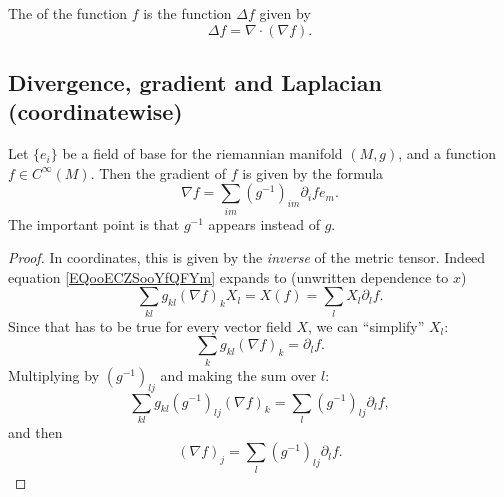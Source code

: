 The  of the function $f$ is the function $\Delta f$ given by
\begin{equation}
\Delta f=\nabla\cdot(\nabla f).
\end{equation}

\subsection{Divergence, gradient and Laplacian (coordinatewise)}

\begin{proposition}
    Let \( \{ e_i \}\) be a field of base for the riemannian manifold \( (M,g)\), and a function \( f\in C^{\infty}(M)\). Then the gradient of \( f\) is given by the formula
    \begin{equation}
        \nabla f=\sum_{im}(g^{-1})_{im}\partial_ife_m.
    \end{equation}
    The important point is that \( g^{-1}\) appears instead of \( g\).
\end{proposition}

\begin{proof}
    In coordinates, this is given by the \emph{inverse} of the metric tensor. Indeed equation \eqref{EQooECZSooYfQFYm} expands to (unwritten dependence to \( x\))
    \begin{equation}
        \sum_{kl}g_{kl}(\nabla f)_kX_l=X(f)=\sum_lX_l\partial_lf.
    \end{equation}
    Since that has to be true for every vector field \( X\), we can ``simplify'' \( X_l\):
    \begin{equation}
        \sum_kg_{kl}(\nabla f)_k=\partial_lf.
    \end{equation}
    Multiplying by \( (g^{-1})_{lj}\) and making the sum over \( l\):
    \begin{equation}
        \sum_{kl}g_{kl}(g^{-1})_{lj}(\nabla f)_k=\sum_l(g^{-1})_{lj}\partial_lf,
    \end{equation}
    and then
    \begin{equation}
        (\nabla f)_j=\sum_l(g^{-1})_{lj}\partial_lf.
    \end{equation}
\end{proof}


